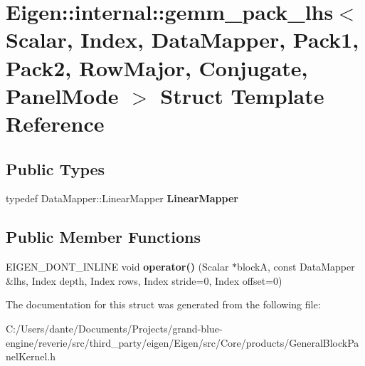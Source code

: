 \hypertarget{struct_eigen_1_1internal_1_1gemm__pack__lhs_3_01_scalar_00_01_index_00_01_data_mapper_00_01_packfbcb3001ebc1820bc72c8fc2e505297d}{}\section{Eigen\+::internal\+::gemm\+\_\+pack\+\_\+lhs$<$ Scalar, Index, Data\+Mapper, Pack1, Pack2, Row\+Major, Conjugate, Panel\+Mode $>$ Struct Template Reference}
\label{struct_eigen_1_1internal_1_1gemm__pack__lhs_3_01_scalar_00_01_index_00_01_data_mapper_00_01_packfbcb3001ebc1820bc72c8fc2e505297d}
\subsection*{Public Types}
\begin{DoxyCompactItemize}
\item 
\mbox{\label{struct_eigen_1_1internal_1_1gemm__pack__lhs_3_01_scalar_00_01_index_00_01_data_mapper_00_01_packfbcb3001ebc1820bc72c8fc2e505297d_ac65cbbf4ddb84aa94acf52e1f1d356cb}} 
typedef Data\+Mapper\+::\+Linear\+Mapper {\bfseries Linear\+Mapper}
\end{DoxyCompactItemize}
\subsection*{Public Member Functions}
\begin{DoxyCompactItemize}
\item 
\mbox{\label{struct_eigen_1_1internal_1_1gemm__pack__lhs_3_01_scalar_00_01_index_00_01_data_mapper_00_01_packfbcb3001ebc1820bc72c8fc2e505297d_af0f474d4d31213df020ad25af0c482d3}} 
E\+I\+G\+E\+N\+\_\+\+D\+O\+N\+T\+\_\+\+I\+N\+L\+I\+NE void {\bfseries operator()} (Scalar $\ast$blockA, const Data\+Mapper \&lhs, Index depth, Index rows, Index stride=0, Index offset=0)
\end{DoxyCompactItemize}


The documentation for this struct was generated from the following file\+:\begin{DoxyCompactItemize}
\item 
C\+:/\+Users/dante/\+Documents/\+Projects/grand-\/blue-\/engine/reverie/src/third\+\_\+party/eigen/\+Eigen/src/\+Core/products/General\+Block\+Panel\+Kernel.\+h\end{DoxyCompactItemize}
